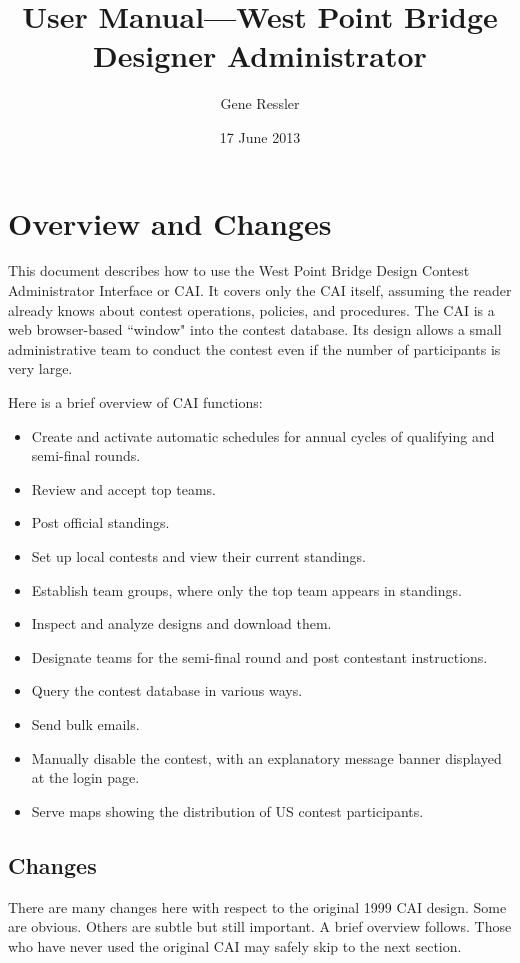 \documentclass[11pt,letterpaper]{refart}
\title{User Manual---West Point Bridge Designer Administrator}
\author{Gene Ressler}
\date{17 June 2013}
\begin{document}
\maketitle
\tableofcontents\newpage

\section{Overview and Changes}
This document describes how to use the West Point Bridge Design Contest Administrator
Interface or CAI. It covers only the CAI itself, assuming the reader already knows
about contest operations, policies, and procedures. The CAI is a web browser-based 
``window" into the contest database. Its design allows a small administrative
team to conduct the contest even if the number of participants is very large. 

Here is a brief overview of CAI functions:
\begin{itemize}
\item Create and activate automatic schedules for annual cycles of qualifying and semi-final rounds.
\item Review and accept top teams.
\item Post official standings.
\item Set up local contests and view their current standings.
\item Establish team groups, where only the top team appears in standings.
\item Inspect and analyze designs and download them.
\item Designate teams for the semi-final round and post contestant instructions.
\item Query the contest database in various ways.
\item Send bulk emails.
\item Manually disable the contest, with an explanatory message banner displayed at
 the login page.
\item Serve maps showing the distribution of US contest participants.
\end{itemize}

\subsection{Changes}
There are many changes here with respect to the original 1999 CAI design. Some are
obvious. Others are subtle but still important. A brief overview follows. Those who
have never used the original CAI may safely skip to the next section.
\end{document}
